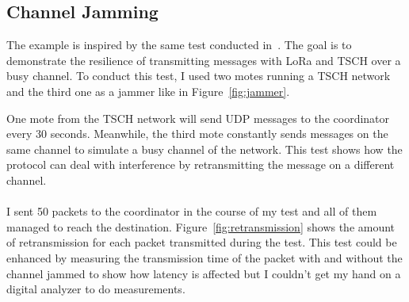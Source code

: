 \subsection{Channel Jamming}

The example is inspired by the same test conducted in~\cite{tschoverlora}.
The goal is to demonstrate the resilience of transmitting messages with LoRa and
TSCH over a busy channel.
To conduct this test, I used two motes running a TSCH network and the third one
as a jammer like in Figure~\ref{fig:jammer}.



One mote from the TSCH network will send UDP messages to the coordinator
every 30 seconds.
Meanwhile, the third mote constantly sends messages on the same channel to
simulate a busy channel of the network.
This test shows how the protocol can deal with interference by retransmitting
the message on a different channel.

\paragraph{}

I sent 50 packets to the coordinator in the course of my test and all of them
managed to reach the destination.
Figure~\ref{fig:retransmission} shows the amount of retransmission for each
packet transmitted during the test.
This test could be enhanced by measuring the transmission time of the packet
with and without the channel jammed to show how latency is affected
but I couldn't get my hand on a digital analyzer to do measurements.

